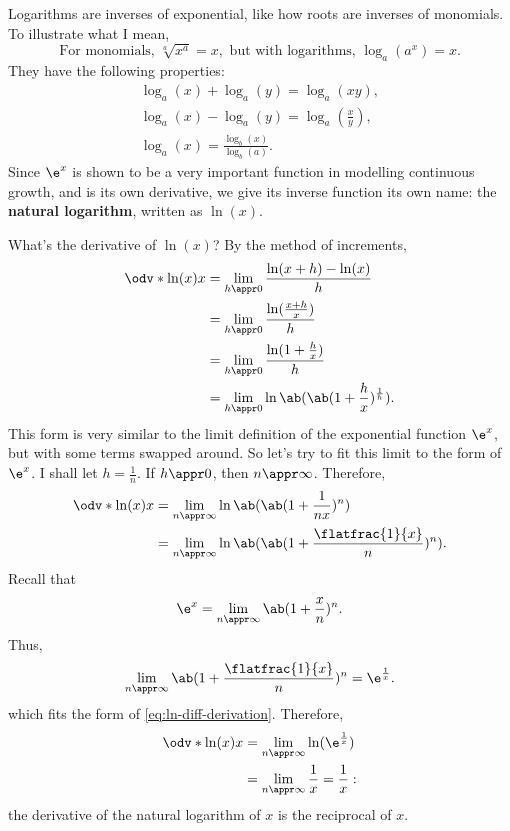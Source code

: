 Logarithms are inverses of exponential, like how roots are inverses of monomials. To illustrate what I mean,
\begin{equation*}
	\textrm{For monomials, } \sqrt[a]{x^a} = x, \textrm{ but with logarithms, } \log_{a}(a^x) = x.
\end{equation*}
They have the following properties:
\begin{gather}
	\log_a(x) + \log_a(y) = \log_a(xy), \\
	\log_a(x) - \log_a(y) = \log_a\left(\frac{x}{y}\right), \\
	\log_a(x) = \frac{\log_b(x)}{\log_b(a)}.
\end{gather}
Since $\e^x$ is shown to be a very important function in modelling continuous growth, and is its own derivative, we give its inverse function its own name: the \textbf{natural logarithm}, written as $\ln(x)$.

What's the derivative of $\ln(x)$? By the method of increments,
\begin{align}
	\odv*{\ln(x)}{x} & = \lim_{h \appr 0}\frac{\ln(x + h) - \ln(x)}{h}                \\
	                 & = \lim_{h \appr 0}\frac{\ln(\frac{x + h}{x})}{h}               \\
	                 & = \lim_{h \appr 0}\frac{\ln(1 + \frac{h}{x})}{h}               \\
	                 & = \lim_{h \appr 0}\ln\ab(\ab(1 + \frac{h}{x})^{\frac{1}{h}}).
\end{align}
This form is very similar to the limit definition of the exponential function $\e^x$, but with some terms swapped around. So let's try to fit this limit to the form of $\e^x$. I shall let $h = \frac{1}{n}$. If $h \appr 0$, then $n \appr \infty$. Therefore,
\begin{align}
	\odv*{\ln(x)}{x} & = \lim_{n \appr \infty}\ln\ab(\ab(1 + \frac{1}{nx})^{n})                                           \\
	                 & = \lim_{n \appr \infty}\ln\ab(\ab(1 + \frac{\flatfrac{1}{x}}{n})^n). \label{eq:ln-diff-derivation}
\end{align}
Recall that
\begin{equation}
	\e^x = \lim_{n \appr \infty}\ab(1 + \frac{x}{n})^n.
\end{equation}
Thus,
\begin{equation}
	\lim_{n \appr \infty}\ab(1 + \frac{\flatfrac{1}{x}}{n})^n = \e^{\frac{1}{x}}.
\end{equation}
which fits the form of \cref{eq:ln-diff-derivation}. Therefore,
\begin{align}
	\odv*{\ln(x)}{x} & = \lim_{n \appr \infty}\ln(\e^{\frac{1}{x}})       \\
	                 & = \lim_{n \appr \infty}\frac{1}{x} = \frac{1}{x}:
\end{align}
the derivative of the natural logarithm of $x$ is the reciprocal of $x$.

